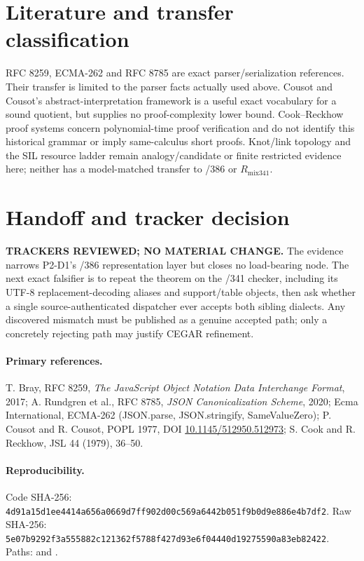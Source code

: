 \documentclass[11pt]{article}
\begin{document}
\section{Literature and transfer classification}
RFC 8259, ECMA-262 and RFC 8785 are exact parser/serialization references.
Their transfer is limited to the parser facts actually used above.  Cousot and
Cousot's abstract-interpretation framework is a useful exact vocabulary for a
sound quotient, but supplies no proof-complexity lower bound.  Cook--Reckhow
proof systems concern polynomial-time proof verification and do not identify
this historical grammar or imply same-calculus short proofs.  Knot/link
topology and the SIL resource ladder remain analogy/candidate or finite
restricted evidence here; neither has a model-matched transfer to /386 or
$R_{\mathrm{mix341}}$.

\section{Handoff and tracker decision}
\textbf{TRACKERS REVIEWED; NO MATERIAL CHANGE.}  The evidence narrows P2-D1's
/386 representation layer but closes no load-bearing node.  The next exact
falsifier is to repeat the theorem on the /341 checker, including its UTF-8
replacement-decoding aliases and support/table objects, then ask whether a
single source-authenticated dispatcher ever accepts both sibling dialects.
Any discovered mismatch must be published as a genuine accepted path; only a
concretely rejecting path may justify CEGAR refinement.

\paragraph{Primary references.}
T. Bray, RFC 8259, \emph{The JavaScript Object Notation Data Interchange
Format}, 2017; A. Rundgren et al., RFC 8785, \emph{JSON Canonicalization
Scheme}, 2020; Ecma International, ECMA-262 (JSON.parse, JSON.stringify,
SameValueZero); P. Cousot and R. Cousot, POPL 1977,
DOI \href{https://doi.org/10.1145/512950.512973}{10.1145/512950.512973};
S. Cook and R. Reckhow, JSL 44 (1979), 36--50.

\paragraph{Reproducibility.}
Code SHA-256:
\texttt{4d91a15d1ee4414a656a0669d7ff902d00c569a6442b051f9b0d9e886e4b7df2}.
Raw SHA-256:
\texttt{5e07b9292f3a555882c121362f5788f427d93e6f04440d19275590a83eb82422}.
Paths:
and
.
\end{document}
